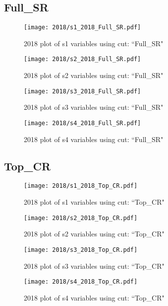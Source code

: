 \documentclass{article}
\begin{document}
      \subsection*{Full\_SR}
                        \begin{figure}[H]
                            \centering
                            \caption{2018 plot of s1 variables using cut: ``Full\_SR"}
                            \texttt{[image: 2018/s1\_2018\_Full\_SR.pdf]}
                        \end{figure}    
                        \begin{figure}[H]
                            \centering
                            \caption{2018 plot of s2 variables using cut: ``Full\_SR"}
                            \texttt{[image: 2018/s2\_2018\_Full\_SR.pdf]}
                        \end{figure}    
                        \begin{figure}[H]
                            \centering
                            \caption{2018 plot of s3 variables using cut: ``Full\_SR"}
                            \texttt{[image: 2018/s3\_2018\_Full\_SR.pdf]}
                        \end{figure}    
                        \begin{figure}[H]
                            \centering
                            \caption{2018 plot of s4 variables using cut: ``Full\_SR"}
                            \texttt{[image: 2018/s4\_2018\_Full\_SR.pdf]}
                        \end{figure}    
      \subsection*{Top\_CR}
                        \begin{figure}[H]
                            \centering
                            \caption{2018 plot of s1 variables using cut: ``Top\_CR"}
                            \texttt{[image: 2018/s1\_2018\_Top\_CR.pdf]}
                        \end{figure}    
                        \begin{figure}[H]
                            \centering
                            \caption{2018 plot of s2 variables using cut: ``Top\_CR"}
                            \texttt{[image: 2018/s2\_2018\_Top\_CR.pdf]}
                        \end{figure}    
                        \begin{figure}[H]
                            \centering
                            \caption{2018 plot of s3 variables using cut: ``Top\_CR"}
                            \texttt{[image: 2018/s3\_2018\_Top\_CR.pdf]}
                        \end{figure}    
                        \begin{figure}[H]
                            \centering
                            \caption{2018 plot of s4 variables using cut: ``Top\_CR"}
                            \texttt{[image: 2018/s4\_2018\_Top\_CR.pdf]}
                        \end{figure}    
\end{document}
